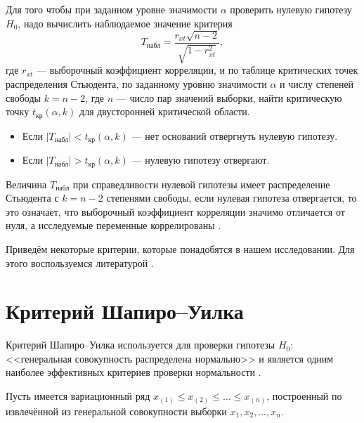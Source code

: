 Для того чтобы при заданном уровне значимости $\alpha$ проверить нулевую гипотезу $H_0$, надо вычислить наблюдаемое значение критерия
\begin{equation*}
	T_{\textrm{набл}} = \frac{r_{xt}\sqrt{n - 2}}{\sqrt{1 - r_{xt}^{2}}},
\end{equation*}
где $r_{xt}$ --- выборочный коэффициент корреляции, и по таблице критических точек распределения Стьюдента, по заданному уровню значимости $\alpha$ и числу степеней свободы $k = n - 2$, где $n$ --- число пар значений выборки, найти критическую точку $t_{\textrm{кр}}(\alpha, k)$ для двусторонней критической области.
\begin{itemize}
	\item Если $\vert T_{\textrm{набл}} \vert < t_{\textrm{кр}}(\alpha, k)$ --- нет оснований отвергнуть нулевую гипотезу.
	\item Если $\vert T_{\textrm{набл}} \vert > t_{\textrm{кр}}(\alpha, k)$ --- нулевую гипотезу отвергают.
\end{itemize}

Величина $T_{\textrm{набл}}$ при справедливости нулевой гипотезы имеет распределение Стьюдента с $k = n - 2$ степенями свободы, если нулевая гипотеза отвергается, то это означает, что выборочный коэффициент корреляции значимо отличается от нуля, а исследуемые переменные коррелированы \cite{Eliseeva1995}.


Приведём некоторые критерии, которые понадобятся в нашем исследовании. Для этого воспользуемся литературой \cite{Gmurman2003,Mikulik2002}.

\section*{Критерий Шапиро--Уилка} %
\label{sec:shapiro_wilk}

Критерий Шапиро--Уилка используется для проверки гипотезы $H_0$: <<генеральная совокупность распределена нормально>> и является одним наиболее эффективных критериев проверки нормальности \cite{Shapiro1972}. 

Пусть имеется вариационный ряд $x_{(1)} \le x_{(2)} \le \ldots \le x_{(n)}$, построенный по извлечённой из генеральной совокупности выборки $x_1, x_2, \ldots, x_n$.

